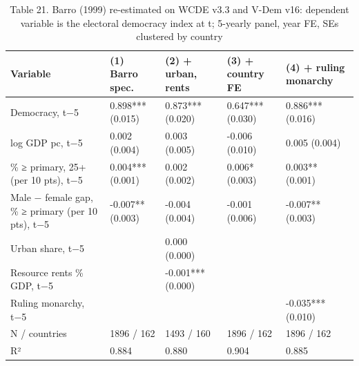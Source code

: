 \begin{table}
\caption{Table 21. Barro (1999) re-estimated on WCDE v3.3 and V-Dem v16: dependent variable is the electoral democracy index at t; 5-yearly panel, year FE, SEs clustered by country}
\label{tab:T21_barro_replication}
\begin{tabular}{lllll}
\toprule
Variable & (1) Barro spec. & (2) + urban, rents & (3) + country FE & (4) + ruling monarchy \\
\midrule
Democracy, t−5 & 0.898*** (0.015) & 0.873*** (0.020) & 0.647*** (0.030) & 0.886*** (0.016) \\
log GDP pc, t−5 & 0.002 (0.004) & 0.003 (0.005) & -0.006 (0.010) & 0.005 (0.004) \\
\% ≥ primary, 25+ (per 10 pts), t−5 & 0.004*** (0.001) & 0.002 (0.002) & 0.006* (0.003) & 0.003** (0.001) \\
Male − female gap, \% ≥ primary (per 10 pts), t−5 & -0.007** (0.003) & -0.004 (0.004) & -0.001 (0.006) & -0.007** (0.003) \\
Urban share, t−5 &  & 0.000 (0.000) &  &  \\
Resource rents \% GDP, t−5 &  & -0.001*** (0.000) &  &  \\
Ruling monarchy, t−5 &  &  &  & -0.035*** (0.010) \\
N / countries & 1896 / 162 & 1493 / 160 & 1896 / 162 & 1896 / 162 \\
R² & 0.884 & 0.880 & 0.904 & 0.885 \\
\bottomrule
\end{tabular}
\end{table}
